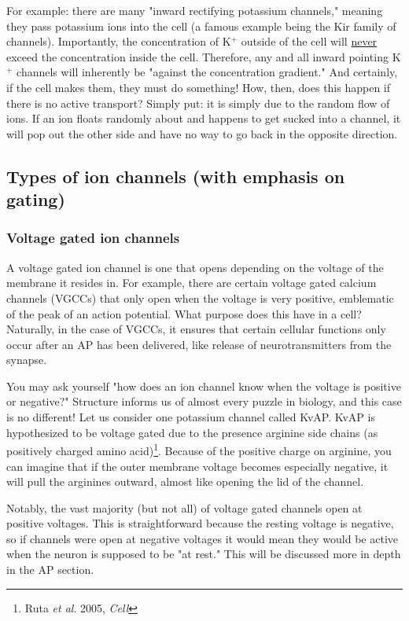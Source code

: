 \documentclass[12pt]{amsart}
\begin{document}
For example: there are many "inward rectifying potassium channels," meaning they pass potassium ions into the cell (a famous example being the Kir family of channels). Importantly, the concentration of K$^+$ outside of the cell will \underline{never} exceed the concentration inside the cell. Therefore, any and all inward pointing K$^+$ channels will inherently be "against the concentration gradient." And certainly, if the cell makes them, they must do something! How, then, does this happen if there is no active transport? Simply put: it is simply due to the random flow of ions. If an ion floats randomly about and happens to get sucked into a channel, it will pop out the other side and have no way to go back in the opposite direction. 

\subsection{Types of ion channels (with emphasis on gating)}
\subsubsection{Voltage gated ion channels} A voltage gated ion channel is one that opens depending on the voltage of the membrane it resides in. For example, there are certain voltage gated calcium channels (VGCCs) that only open when the voltage is very positive, emblematic of the peak of an action potential. What purpose does this have in a cell? Naturally, in the case of VGCCs, it ensures that certain cellular functions only occur after an AP has been delivered, like release of neurotransmitters from the synapse. \newline

You may ask yourself "how does an ion channel know when the voltage is positive or negative?" Structure informs us of almost every puzzle in biology, and this case is no different! Let us consider one potassium channel called KvAP. KvAP is hypothesized to be voltage gated due to the presence arginine side chains (as positively charged amino acid)\footnote{Ruta \textit{et al}. 2005, \textit{Cell}}. Because of the positive charge on arginine, you can imagine that if the outer membrane voltage becomes especially negative, it will pull the arginines outward, almost like opening the lid of the channel. \newline

Notably, the vast majority (but not all) of voltage gated channels open at positive voltages. This is straightforward because the resting voltage is negative, so if channels were open at negative voltages it would mean they would be active when the neuron is supposed to be "at rest." This will be discussed more in depth in the AP section. 
\end{document}

